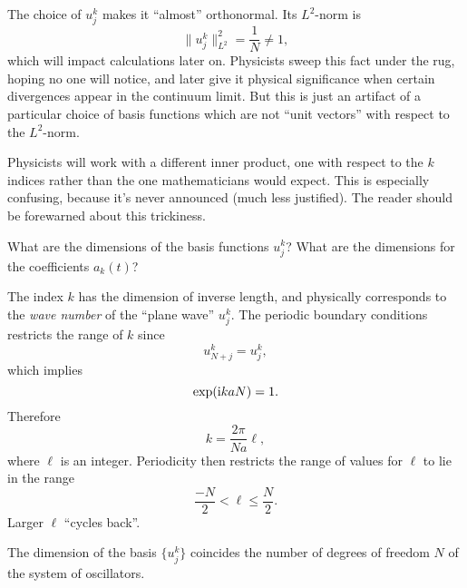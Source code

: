 \begin{remark}
The choice of $u_{j}^{k}$ makes it ``almost'' orthonormal. Its $L^{2}$-norm is
\begin{equation}
\|u_{j}^{k}\|_{L^{2}}^{2}=\frac{1}{N}\neq1,
\end{equation}
which will impact calculations later on. Physicists sweep this fact
under the rug, hoping no one will notice, and later give it physical
significance when certain divergences appear in the continuum limit. But
this is just an artifact of a particular choice of basis functions which
are not ``unit vectors'' with respect to the $L^{2}$-norm.
\end{remark}

\begin{ddanger}
Physicists will work with a different inner product, one with respect to
the $k$ indices rather than the one mathematicians would expect. This is
especially confusing, because it's never announced (much less justified).
The reader should be forewarned about this trickiness.
\end{ddanger}

\begin{exercise}
What are the dimensions of the basis functions $u^{k}_{j}$? What are the
dimensions for the coefficients $a_{k}(t)$?
\end{exercise}

\M The index $k$ has the dimension of inverse length, and physically
corresponds to the \emph{wave number} of the ``plane wave'' $u^{k}_{j}$.
The periodic boundary conditions restricts the range of $k$ since
\begin{equation}
u^{k}_{N+j}=u^{k}_{j},
\end{equation}
which implies
\begin{equation}
\exp(\mathrm{i} kaN) = 1.
\end{equation}
Therefore
\begin{equation}\label{eq:classical-field-theory:linear-chain:wave-length-range}
k = \frac{2\pi}{N a}\ell,
\end{equation}
where $\ell$ is an integer. 
Periodicity then restricts the range of values for $\ell$ to lie in the 
range
\begin{equation}
\frac{-N}{2}<\ell\leq\frac{N}{2}.
\end{equation}
Larger $\ell$ ``cycles back''.

\M
The dimension of the basis $\{u^{k}_{j}\}$ coincides the number of
degrees of freedom $N$ of the system of oscillators.

